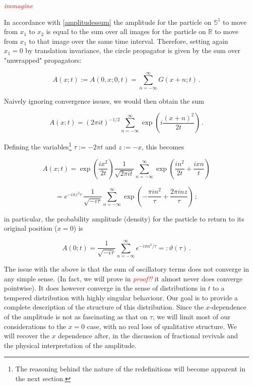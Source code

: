 \documentclass{article}
\newcommand{\ess}{\ensuremath{\mathbb{S}}}
\newcommand{\ar}{\ensuremath{\mathbb{R}}}
\newcommand{\T}{\ensuremath{\vartheta}}
\newcommand{\cmnt}[1]{\textcolor{red}{\emph{#1}}}
\newcommand{\sumZ}{\sum_{n=-\infty}^{\infty}}
\begin{document}
\cmnt{immagine}

In accordance with \eqref{amplitudessum} the amplitude for the particle on $\ess^1$ to move from $x_1$ to $x_2$ is equal to the sum over all images for the particle on $\ar$ to move from $x_1$ to that image over the same time interval. Therefore, setting again $x_1 = 0$ by translation invariance, the circle propagator is given by the sum over "unwrapped" propagators:

\begin{equation}
    A(x;t) := A(0,x;0,t) = \sumZ G(x + n; t)\,.
\end{equation}

Naively ignoring convergence issues, we would then obtain the sum

\begin{equation}
    A(x;t) = (2\pi i t)^{-1/2} \sumZ \exp(i \frac{(x+ n)^2}{2t})\,.
\end{equation}

Defining the variables\footnote{The reasoning behind the nature of the redefinitions will become apparent in the next section.} $\tau := - 2\pi t $ and $z := - x$, this becomes

\begin{equation}
    A(x;t) = \exp(\frac{ix^2}{2t}) \frac{1}{\sqrt{2\pi i t}} \sumZ \exp( \frac{in^2}{2t} + \frac{ixn}{t} ) 
\end{equation}


\begin{equation}
    = e^{-i\pi z^2 \tau}\, \frac{1}{\sqrt{-i\tau}} \sumZ \exp(-\frac{\pi i n^2}{\tau} +  \frac{2\pi i n z}{\tau})   \,;
\end{equation}


in particular, the probability amplitude (density) for the particle to return to its original position ($x=0$) is

\begin{equation}
    A(0;t) = \frac{1}{\sqrt{-i\tau}} \sumZ e^{-{i \pi n^2}/{\tau}} =: \T(\tau)\,.
\end{equation}

The issue with the above is that the sum of oscillatory terms does not converge in any simple sense. (In fact, we will prove in \cmnt{proof!!} it almost never does converge pointwise). It does however converge in the sense of distributions in $t$ to a tempered distribution with highly singular behaviour. Our goal is to provide a complete description of the structure of this distribution. Since the $x$-dependence of the amplitude is not as fascinating as that on $\tau$, we will limit most of our considerations to the $x=0$ case, with no real loss of qualitative structure. We will recover the $x$ dependence after, in the discussion of fractional revivals and the physical interpretation of the amplitude.
\end{document}
